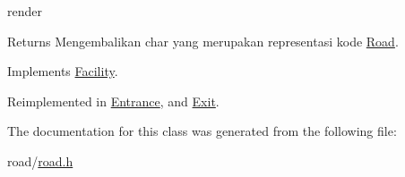 render 

\begin{DoxyReturn}{Returns}
Mengembalikan char yang merupakan representasi kode \hyperlink{classRoad}{Road}. 
\end{DoxyReturn}


Implements \hyperlink{classFacility_a177b3f9cd142fe4521c1d15b00d3675c}{Facility}.



Reimplemented in \hyperlink{classEntrance_a7226e0cd3d04f8370ede2573bc2852f3}{Entrance}, and \hyperlink{classExit_a9239e8b13c101d1aee8fde738e8a5fdc}{Exit}.



The documentation for this class was generated from the following file\+:\begin{DoxyCompactItemize}
\item 
road/\hyperlink{road_8h}{road.\+h}\end{DoxyCompactItemize}
